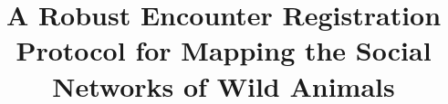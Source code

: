 \documentclass[conference,10pt]{IEEEtran}
\begin{document}
\title{A Robust Encounter Registration Protocol for Mapping the Social Networks of Wild Animals}



\maketitle





% 















\end{document}
